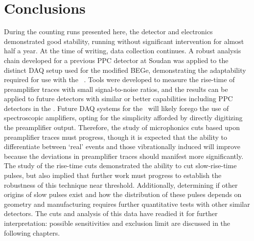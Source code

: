 
	\section{Conclusions}
     	\label{sec:BeGeConclusions}		
	
	During the counting runs presented here, the detector and electronics demonstrated good stability, running without significant intervention for almost half a year.  At the time of writing, data collection continues.  A robust analysis chain developed for a previous PPC detector at Soudan was applied to the distinct DAQ setup used for the modified BEGe, demonstrating the adaptability required for use with the \MJ~\minmod.  Tools were developed to measure the rise-time of preamplifier traces with small signal-to-noise ratios, and the results can be applied to future detectors with similar or better capabilities including PPC detectors in the \minmod.  Future DAQ systems for the \minmod~will likely forego the use of spectroscopic amplifiers, opting for the simplicity afforded by directly digitizing the preamplifier output.  Therefore, the study of microphonics cuts based upon preamplifier traces must progress, though it is expected that the ability to differentiate between `real' events and those vibrationally induced will improve because the deviations in preamplifier traces should manifest more significantly.  The study of the rise-time cuts demonstrated the ability to cut slow-rise-time pulses, but also implied that further work must progress to establish the robustness of this technique near threshold.  Additionally, determining if other origins of slow pulses exist and how the distribution of these pulses depends on geometry and manufacturing requires further quantitative tests with other similar detectors.  The cuts and analysis of this data have readied it for further interpretation: possible sensitivities and exclusion limit are discussed in the following chapters.

